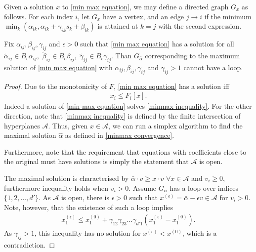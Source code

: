 \documentclass[11pt, oneside]{amsart}
\begin{document}
\begin{definition}
	Given a solution $x$ to \cref{min max equation}, we may define a directed graph $G_x$ as follows. For each index $i$, let $G_x$ have a vertex, and an edge $j\to i$ if the minimum $\min_k(\alpha_{ik},\alpha_{ik}+\gamma_{ik}s_k+\beta_{ik})$ is attained at $k=j$ with the second expression.
\end{definition}

\begin{lemma}\label{loop lemma}
	Fix $\alpha_{ij},\beta_{ij},\gamma_{ij}$ and $\epsilon>0$ such that \cref{min max equation} has a solution for all $\tilde{\alpha}_{ij}\in B_\epsilon{\alpha_{ij}},$ $\tilde{\beta}_{ij}\in B_\epsilon{\beta_{ij}},$ $\tilde{\gamma}_{ij}\in B_\epsilon{\gamma_{ij}}$. Than $G_{\bar\alpha}$ corresponding to the maximum solution of \cref{min max equation} with $\alpha_{ij},\beta_{ij},\gamma_{ij}$ and $\gamma_{ij}>1$ cannot have a loop.
\end{lemma}
\begin{proof}
	Due to the monotonicity of $F$, \cref{min max equation} has a solution iff 
	\begin{equation}\label{minmax inequality}
		\begin{gathered}
			x_i\leq F_i[x].
		\end{gathered}
	\end{equation}
	Indeed a solution of \cref{min max equation} solves \cref{minmax inequality}. For the other direction, note that \cref{minmax inequality} is defined by the finite intersection of hyperplanes $\mathcal{A}$. Thus, given $x\in\mathcal{A}$, we can run a simplex algorithm to find the maximal solution $\hat{\alpha}$ as defined in \cref{minmax convergence}. 
	
	Furthermore, note that the requirement that equations with coefficients close to the original must have solutions is simply the statement that $\mathcal{A}$ is open.
	
	The maximal solution is characterised by $\bar{\alpha}\cdot v\geq x\cdot v $ $\forall x\in\mathcal{A}$ and $v_i\geq0$, furthermore inequality holds when $v_i>0$. Assume $G_{\bar\alpha}$ has a loop over indices $\{1,2,...,d'\}$. As $\mathcal{A}$ is open, there is $\epsilon>0$ such that $x^{(\epsilon)}=\bar\alpha-\epsilon v\in\mathcal{A}$ for $v_i>0$. Note, however, that the existence of such a loop implies
	\begin{equation*}
		\begin{gathered}
			x^{(\epsilon)}_1\leq x^{(0)}_1+\gamma_{12}\gamma_{23}...\gamma_{d'1}(x^{(\epsilon)}_1-x^{(0)}_1).
		\end{gathered}
	\end{equation*}
	As $\gamma_{ij}>1$, this inequality has no solution for $x^{(\epsilon)}<x^{(0)}$, which is a contradiction.
\end{proof}
 
\end{document}
